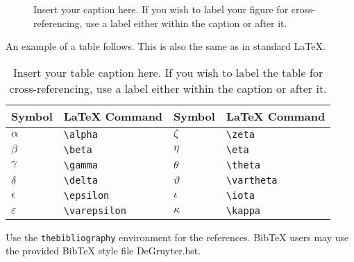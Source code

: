 \documentclass[letterpaper,12pt]{article}
\begin{document}
\begin{figure}[!h]
\centering
\caption{Insert your caption here. If you wish to label your figure for
  cross-referencing, use a label either within the caption or after it.}
\label{fig1}
\end{figure}

An example of a table follows. This is also the same as in standard LaTeX.

\begin{table}[!h]
\centering
\caption{Insert your table caption here. If you wish to label the table for
  cross-referencing, use a label either within the caption or after it.}
\begin{tabular}{llll}
\hline
Symbol        & LaTeX Command      & Symbol      & LaTeX Command \\
\hline
$\alpha$      & \verb+\alpha+      & $\zeta$     & \verb+\zeta+ \\
$\beta$       & \verb+\beta+       & $\eta$      & \verb+\eta+ \\
$\gamma$      & \verb+\gamma+      & $\theta$    & \verb+\theta+ \\
$\delta$      & \verb+\delta+      & $\vartheta$ & \verb+\vartheta+ \\
$\epsilon$    & \verb+\epsilon+    & $\iota$     & \verb+\iota+ \\
$\varepsilon$ & \verb+\varepsilon+ & $\kappa$    & \verb+\kappa+ \\
\hline
\end{tabular}
\end{table}

Use the \verb+thebibliography+ environment for the references.  BibTeX users may
use the provided BibTeX style file DeGruyter.bst.



\end{document}
